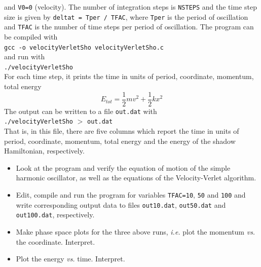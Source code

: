 \documentclass[a4paper,12pt]{article}
\begin{document}
\begin{enumerate}
and \texttt{V0=0} (velocity). 
The number of integration steps is \texttt{NSTEPS}  and the time step size is given by \texttt{deltat = Tper / TFAC}, where \texttt{Tper} is the period of oscillation and \texttt{TFAC} is the number of time steps per period of oscillation.
The program can be compiled with\\
\noindent \texttt{gcc -o velocityVerletSho velocityVerletSho.c}\\
\noindent and run with\\
\noindent \texttt{./velocityVerletSho} \\
\noindent For each time step, it prints the time in units of period, coordinate, momentum, total energy 
\begin{equation}
E_{\mathit{tot}} = \frac{1}{2} m v^2 + \frac{1}{2}  k x^2
\end{equation}
The output can be written to a file \texttt{out.dat} with \\
\noindent  \texttt{./velocityVerletSho} $>$ \texttt{out.dat} \\
\noindent That is, in this file, there are five columns which report
the time in units of period, coordinate, momentum, total energy and the energy of the shadow Hamiltonian, respectively.
\begin{itemize}
\item Look at the program and verify the equation of motion of the simple harmonic oscillator, as well as the equations of the Velocity-Verlet algorithm.
\item Edit, compile and run the program for variables \texttt{TFAC=10}, \texttt{50} and \texttt{100} and write corresponding output data to files
\texttt{out10.dat},
\texttt{out50.dat} and
\texttt{out100.dat}, respectively.
\item Make phase space plots for the three above runs, {\em i.e.} plot the momentum {\em vs.} the coordinate. Interpret.
\item Plot the energy {\em vs.} time. Interpret.
\end{itemize}
\end{enumerate}
%
%
%
\end{document}
